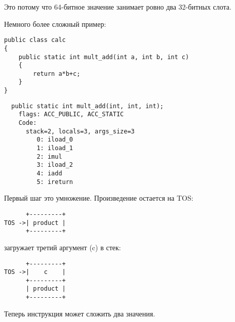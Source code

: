 Это потому что 64-битное значение  занимает ровно два 32-битных слота.


Немного более сложный пример:

\begin{lstlisting}
public class calc
{
	public static int mult_add(int a, int b, int c)
	{
		return a*b+c;
	}
}
\end{lstlisting}

\begin{lstlisting}
  public static int mult_add(int, int, int);
    flags: ACC_PUBLIC, ACC_STATIC
    Code:
      stack=2, locals=3, args_size=3
         0: iload_0       
         1: iload_1       
         2: imul          
         3: iload_2       
         4: iadd          
         5: ireturn       
\end{lstlisting}


Первый шаг это умножение. Произведение остается на \ac{TOS}:

\begin{lstlisting}
      +---------+
TOS ->| product |
      +---------+
\end{lstlisting}

 загружает третий аргумент (c) в стек:

\begin{lstlisting}
      +---------+
TOS ->|    c    |
      +---------+
      | product |
      +---------+
\end{lstlisting}


Теперь инструкция  может сложить два значения.
